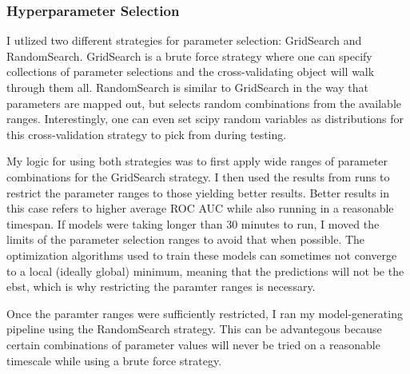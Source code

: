 \documentclass{article}
\begin{document}
            \subsubsection{Hyperparameter Selection}
                I utlized two different strategies for parameter selection: GridSearch and RandomSearch.
                GridSearch is a brute force strategy where one can specify collections of parameter selections and the cross-validating object will walk through them all. 
                RandomSearch is similar to GridSearch in the way that parameters are mapped out, but selects random combinations from the available ranges.
                Interestingly, one can even set scipy \cite{scipy} random variables as distributions for this cross-validation strategy to pick from during testing. 

                My logic for using both strategies was to first apply wide ranges of parameter combinations for the GridSearch strategy.
                I then used the results from runs to restrict the parameter ranges to those yielding better results.
                Better results in this case refers to higher average ROC AUC while also running in a reasonable timespan. 
                If models were taking longer than 30 minutes to run, I moved the limits of the parameter selection ranges to avoid that when possible.
                The optimization algorithms used to train these models can sometimes not converge to a local (ideally global) minimum, meaning that the predictions will not be the ebst, which is why restricting the paramter ranges is necessary.

                Once the paramter ranges were sufficiently restricted, I ran my model-generating pipeline using the RandomSearch strategy.
                This can be advantegous because certain combinations of parameter values will never be tried on a reasonable timescale while using a brute force strategy.
\end{document}
